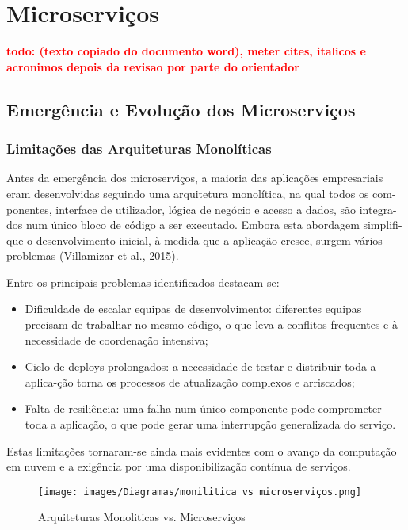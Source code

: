 \chapter{Microserviços}

\textbf{\textcolor{red}{todo: (texto copiado do documento word), meter cites, italicos e acronimos depois da revisao por parte do orientador}}

\section{Emergência e Evolução dos Microserviços}

\subsection{Limitações das Arquiteturas Monolíticas}

Antes da emergência dos microserviços, a maioria das aplicações empresariais eram desenvolvidas seguindo uma arquitetura monolítica, na qual todos os com-ponentes, interface de utilizador, lógica de negócio e acesso a dados, são integra-dos num único bloco de código a ser executado. Embora esta abordagem simplifi-que o desenvolvimento inicial, à medida que a aplicação cresce, surgem vários problemas (Villamizar et al., 2015).

Entre os principais problemas identificados destacam-se:

\begin{itemize}
    \item Dificuldade de escalar equipas de desenvolvimento: diferentes equipas precisam de trabalhar no mesmo código, o que leva a conflitos frequentes e à necessidade de coordenação intensiva;
    \item Ciclo de deploys prolongados: a necessidade de testar e distribuir toda a aplica-ção torna os processos de atualização complexos e arriscados;
    \item Falta de resiliência: uma falha num único componente pode comprometer toda a aplicação, o que pode gerar uma interrupção generalizada do serviço.
\end{itemize}

Estas limitações tornaram-se ainda mais evidentes com o avanço da computação em nuvem e a exigência por uma disponibilização contínua de serviços.

\begin{figure}[h]
    \centering
    \texttt{[image: images/Diagramas/monilitica vs microserviços.png]}
    \caption{Arquiteturas Monoliticas vs. Microserviços}
\end{figure}

